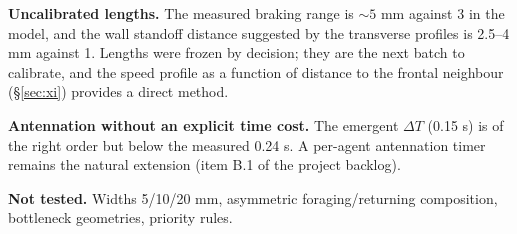 \documentclass[11pt,a4paper]{article}
\begin{document}
\textbf{Uncalibrated lengths.} The measured braking range is $\sim5$ mm against
3 in the model, and the wall standoff distance suggested by the transverse
profiles is 2.5--4 mm against 1. Lengths were frozen by decision; they are the
next batch to calibrate, and the speed profile as a function of distance to the
frontal neighbour (\S\ref{sec:xi}) provides a direct method.

\textbf{Antennation without an explicit time cost.} The emergent $\Delta T$
(0.15 s) is of the right order but below the measured 0.24 s. A per-agent
antennation timer remains the natural extension (item B.1 of the project
backlog).

\textbf{Not tested.} Widths 5/10/20 mm, asymmetric foraging/returning
composition, bottleneck geometries, priority rules.
\end{document}
